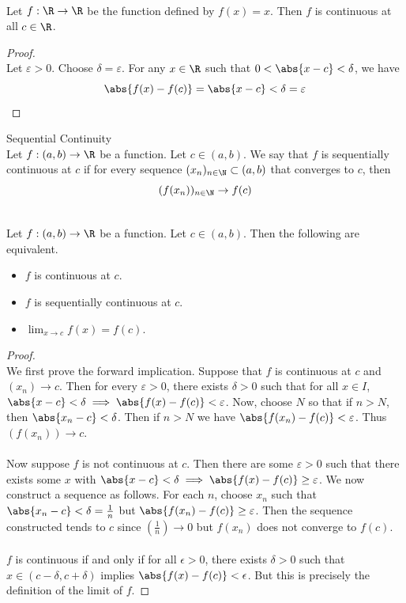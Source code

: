 \documentclass[a4paper]{article}
\begin{document}
\begin{eg}{}{}\\
Let $f:\R\to\R$ be the function defined by $f(x)=x$. Then $f$ is continuous at all $c\in\R$. 
\begin{proof}\\
Let $\varepsilon>0$. Choose $\delta=\varepsilon$. For any $x\in\R$ such that $0<\abs{x-c}<\delta$, we have $$\abs{f(x)-f(c)}=\abs{x-c}<\delta=\varepsilon$$
\end{proof}
\end{eg}

\begin{defn}{Sequential Continuity}{}\\ Let $f:(a,b)\to\R$ be a function. Let $c\in (a,b)$. We say that $f$ is sequentially continuous at $c$ if for every sequence $(x_n)_{n\in\N}\subset(a,b)$ that converges to $c$, then $$(f(x_n))_{n\in\N}\to f(c)$$
\end{defn}

\begin{prp}{}{}\\ Let $f:(a,b)\to\R$ be a function. Let $c\in (a,b)$. Then the following are equivalent. 
\begin{itemize}
\item $f$ is continuous at $c$. 
\item $f$ is sequentially continuous at $c$. 
\item $\lim_{x\to c}f(x)=f(c)$. 
\end{itemize} 
\begin{proof}\\ We first prove the forward implication. Suppose that $f$ is continuous at $c$ and $(x_n)\to c$. Then for every $\varepsilon>0$, there exists $\delta>0$ such that for all $x\in I$, $\abs{x-c}<\delta\implies\abs{f(x)-f(c)}<\varepsilon$. Now, choose $N$ so that if $n>N$, then $\abs{x_n-c}<\delta$. Then if $n>N$ we have $\abs{f(x_n)-f(c)}<\varepsilon$. Thus $\left(f(x_n)\right)\to c$. \\~\\
Now suppose $f$ is not continuous at $c$. Then there are some $\varepsilon>0$ such that there exists some $x$ with $\abs{x-c}<\delta\implies\abs{f(x)-f(c)}\geq\varepsilon$. We now construct a sequence as follows. For each $n$, choose $x_n$ such that $\abs{x_n-c}<\delta=\frac{1}{n}$ but $\abs{f(x_n)-f(c)}\geq\varepsilon$. Then the sequence constructed tends to $c$ since $\left(\frac{1}{n}\right)\to0$ but $f(x_n)$ does not converge to $f(c)$. \\~\\

$f$ is continuous if and only if for all $\epsilon>0$, there exists $\delta>0$ such that $x\in(c-\delta,c+\delta)$ implies $\abs{f(x)-f(c)}<\epsilon$. But this is precisely the definition of the limit of $f$. 
\end{proof}
\end{prp}
\end{document}
